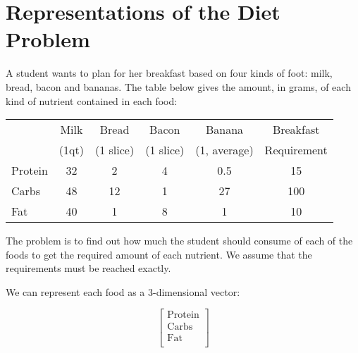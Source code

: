 \documentclass[12pt]{article}
\begin{document}
\section{Representations of the Diet Problem}

A student wants to plan for her breakfast based on four kinds of foot: milk, bread, bacon and bananas. The table below gives the amount, in grams, of each kind of nutrient contained in each food:

\begin{center}
\begin{tabular}{l|cccc|c}
        & Milk  & Bread     & Bacon     & Banana       & Breakfast \\
        & (1qt) & (1 slice) & (1 slice) & (1, average) & Requirement\\\hline
Protein & 32    & 2         & 4         & 0.5          & 15\\
Carbs   & 48    & 12        & 1         & 27           & 100\\
Fat     & 40    & 1         & 8         & 1            & 10\\\hline
\end{tabular}
\end{center}

The problem is to find out how much the student should consume of each of the foods to get the required amount of each nutrient. We assume that the requirements must be reached exactly.

We can represent each food as a 3-dimensional vector:

$$\left[\begin{matrix}\text{Protein}\\\text{Carbs}\\\text{Fat}\\\end{matrix}\right]$$
\end{document}
